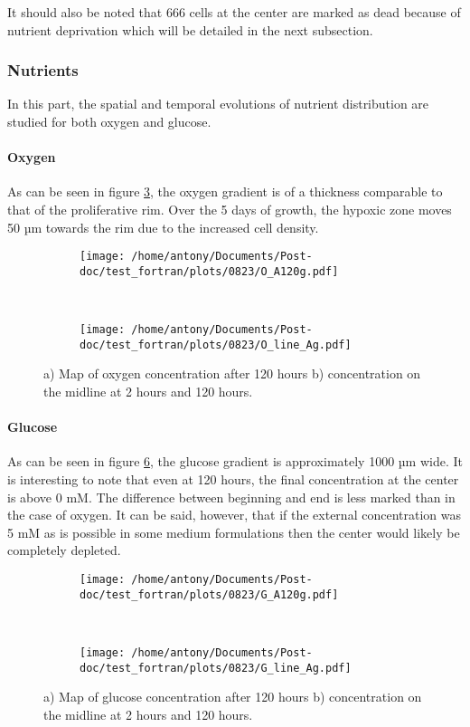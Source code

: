 \documentclass[11pt,a4paper]{article}
\begin{document}
It should also be noted that 666 cells at the center are marked as dead because of nutrient deprivation which will be detailed in the next subsection.

\subsubsection{Nutrients}
In this part, the spatial and temporal evolutions of nutrient distribution are studied for both oxygen and glucose.
	
\paragraph{Oxygen}
As can be seen in figure \ref{O_A}, the oxygen gradient is of a thickness comparable to that of the proliferative rim. Over the 5 days of growth, the hypoxic zone moves 50 µm towards the rim due to the increased cell density. \\

\begin{figure}[ht!]
	\begin{subfigure}{0.5\textwidth}
	\centering
	\texttt{[image: /home/antony/Documents/Post-doc/test\_fortran/plots/0823/O\_A120g.pdf]}
	\caption{ \label{O_A120}}
	\end{subfigure}
	~~
	\begin{subfigure}{0.4\textwidth}
	\texttt{[image: /home/antony/Documents/Post-doc/test\_fortran/plots/0823/O\_line\_Ag.pdf]}
		\caption{ \label{O_line_A}}
	\end{subfigure}
	\caption{a) Map of oxygen concentration after 120 hours b) concentration on the midline at 2 hours and 120 hours.\label{O_A}}
	\end{figure}	


\paragraph{Glucose}
As can be seen in figure \ref{G_A}, the glucose gradient is approximately 1000 µm wide. It is interesting to note that even at 120 hours, the final concentration at the center is above 0 mM. The difference between beginning and end is less marked than in the case of oxygen. It can be said, however, that if the external concentration was 5 mM as is possible in some medium formulations then the center would likely be completely depleted.\\

\begin{figure}[ht!]
	\begin{subfigure}{0.5\textwidth}
	\centering
	\texttt{[image: /home/antony/Documents/Post-doc/test\_fortran/plots/0823/G\_A120g.pdf]}
	\caption{ \label{G_A120}}
	\end{subfigure}
	~~
	\begin{subfigure}{0.4\textwidth}
	\texttt{[image: /home/antony/Documents/Post-doc/test\_fortran/plots/0823/G\_line\_Ag.pdf]}
		\caption{ \label{G_line_A}}
	\end{subfigure}
	\caption{a) Map of glucose concentration after 120 hours b) concentration on the midline at 2 hours and 120 hours.\label{G_A}}
	\end{figure}	
\end{document}
